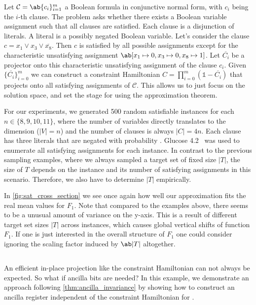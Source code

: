 Let $\mathcal{C} = \ab\{c_i\}_{i=1}^m$  a Boolean formula in conjunctive normal form, with $c_i$ being the $i$-th clause. The \SAT problem asks whether there exists a Boolean variable assignment such that all clauses are satisfied. Each clause is a disjunction of literals. A literal is a possibly negated Boolean variable. Let's consider the clause $c = x_1 \vee x_3 \vee \overline{x_8}$. Then $c$ is satisfied by all possible assignments except for the characteristic unsatisfying assignment $\ab[x_1 \mapsto 0, x_3 \mapsto 0, x_8 \mapsto 1]$. Let $\overline{C_i}$ be a projector onto this characteristic unsatisfying assignment of the clause $c_i$. Given $\{\overline{C_i}\}_{i=0}^m$ we can construct a constraint Hamiltonian $C = \prod_{i = 0}^m (\mathds{1} - \overline{C_i})$ that projects onto all satisfying assignments of $\mathcal{C}$. This allows us to just focus on the solution space, and set the stage for 
using the approximation theorem.

For our experiments, we generated 500 random satisfiable \SAT instances for each $n \in \{8, 9, 10, 11\}$, where the number of variables directly translates to the dimension ($|V| = n$) and the number of clauses is always $|C| = 4n$. Each clause has three literals that are negated with probability . Glucose 4.2~\cite{Audemart:2009} was used to enumerate all satisfying assignments for each instance. In contrast to the previous sampling examples, where we always sampled a target set of fixed size $|T|$, the size of $T$ depends on the instance and its number of satisfying assignments in this scenario. Therefore, we also have to determine $|T|$ empirically.

In \cref{fig:sat_cross_section} we see once again how well our approximation fits the real mean values for $F_1$. Note that compared to the examples above, there seems to be a unusual amount of variance on the y-axis. This is a result of different target set sizes $|T|$ across instances, which causes global vertical shifts of function $F_1$. If one is just interested in the overall structure of $F_1$ one could consider ignoring the scaling factor induced by $\ab|T|$ altogether. 

\subsection{\kclique}
\label{sec:kclique}
An efficient in-place projection like the \SAT constraint Hamiltonian can not always be expected. So what if ancilla bits are needed? In this example, we demonstrate an approach following \cref{thm:ancilla_invariance} by showing how to construct an ancilla register independent of the constraint Hamiltonian for \kclique. 

